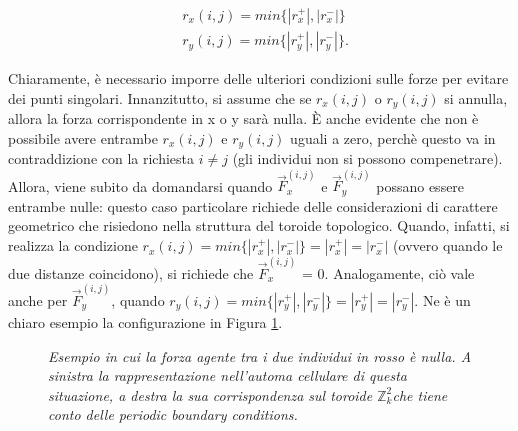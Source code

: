 \documentclass[letterpaper,10pt]{article}
\newcommand{\Zii}{$\mathbb{Z}^2_k$}
\begin{document}
\begin{equation}
\begin{aligned} 
&r_x(i,j) = min\{|r_x^+|, |r_x^-|\}\\
&r_y(i,j) = min\{|r_y^+|, |r_y^-|\}.
\end{aligned}
\label{Eq:6}
\end{equation}

Chiaramente, è necessario imporre delle ulteriori condizioni sulle forze per evitare dei punti singolari. Innanzitutto, si assume che se $r_x(i,j)$ o $r_y(i,j)$ si annulla, allora la forza corrispondente in x o y sarà nulla. È anche evidente che non è possibile avere entrambe $r_x(i,j)$ e $r_y(i,j)$ uguali a zero, perchè questo va in contraddizione con la richiesta $i\neq j$ (gli individui non si possono compenetrare). Allora, viene subito da domandarsi quando $\vec{F}^{(i,j)}_x$ e $\vec{F}^{(i,j)}_y$ possano essere entrambe nulle: questo caso particolare richiede delle considerazioni di carattere geometrico che risiedono nella struttura del toroide topologico. Quando, infatti, si realizza la condizione $r_x(i,j) = min\{|r_x^+|, |r_x^-|\} = |r_x^+| = |r_x^-|$ (ovvero quando le due distanze coincidono), si richiede che $\vec{F}^{(i,j)}_x$ = 0. Analogamente, ciò vale anche per $\vec{F}^{(i,j)}_y$, quando $r_y(i,j) = min\{|r_y^+|, |r_y^-|\} = |r_y^+| = |r_y^-|$. Ne è un chiaro esempio la configurazione in Figura \ref{Fig:8}.

\begin{figure}[hb]
\centering
\begin{subfigure}[h]{0.48\textwidth}
\centering
{}
\end{subfigure}
\hfill
\begin{subfigure}[h]{0.48\textwidth}
         \centering
{}
\end{subfigure}
\caption{\textit{Esempio in cui la forza agente tra i due individui in rosso è nulla. A sinistra la rappresentazione nell'automa cellulare di questa situazione, a destra la sua corrispondenza sul toroide \Zii  che tiene conto delle periodic boundary conditions.}}
\label{Fig:8}
\end{figure}
\end{document}
